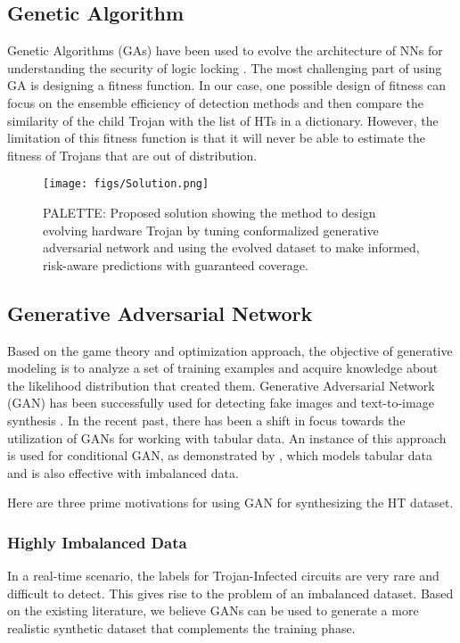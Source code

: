 \documentclass[9pt,conference]{IEEEtran}
\begin{document}
\subsection{Genetic Algorithm} 
\label{sec:GA}
Genetic Algorithms (GAs) \cite{holland1992genetic} have been used to evolve the architecture of NNs for understanding the security of logic locking \cite{sisejkovic2021challenging}. The most challenging part of using GA is designing a fitness function. In our case, one possible design of fitness can focus on the ensemble efficiency of detection methods and then compare the similarity of the child Trojan with the list of HTs in a dictionary. However, the limitation of this fitness function is that it will never be able to estimate the fitness of Trojans that are out of distribution.

\begin{figure*}[ht]
  \centering
   \texttt{[image: figs/Solution.png]}
  \caption{PALETTE: Proposed solution showing the method to design evolving hardware Trojan by tuning conformalized generative adversarial network and using the evolved dataset to make informed, risk-aware predictions with guaranteed coverage.}
  \label{fig:solution}
\end{figure*}

\subsection{Generative Adversarial Network} 
\label{sec:GAN}
Based on the game theory and optimization approach, the objective of generative modeling \cite{goodfellow2020generative} is to analyze a set of training examples and acquire knowledge about the likelihood distribution that created them. Generative Adversarial Network (GAN) has been successfully used for detecting fake images \cite{ojha2023towards} and text-to-image synthesis \cite{kang2023scaling}. In the recent past, there has been a shift in focus towards the utilization of GANs for working with tabular data. An instance of this approach is used for conditional GAN, as demonstrated by \cite{xu2019modeling}, which models tabular data and is also effective with imbalanced data. %

Here are three prime motivations for using GAN for synthesizing the HT dataset. 

\subsubsection{Highly Imbalanced Data} In a real-time scenario, the labels for Trojan-Infected circuits are very rare and difficult to detect. This gives rise to the problem of an imbalanced dataset. Based on the existing literature, we believe GANs can be used to generate a more realistic synthetic dataset that complements the training phase.
\end{document}
